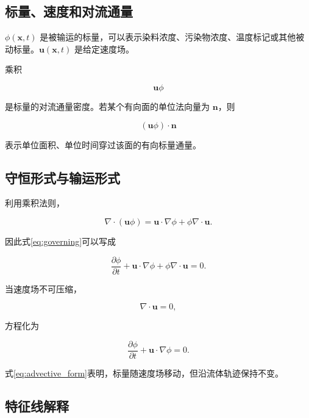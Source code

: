 \documentclass[UTF8,12pt,a4paper,fontset=fandol]{ctexart}
\numberwithin{equation}{section}
\newcommand{\xf}{\bm x}
\begin{document}
\subsection{标量、速度和对流通量}

$\phi(\xf,t)$ 是被输运的标量，可以表示染料浓度、污染物浓度、温度标记或其他被动标量。$\bm u(\xf,t)$ 是给定速度场。

乘积

\begin{equation}
  \bm u\phi
\end{equation}

是标量的对流通量密度。若某个有向面的单位法向量为 $\bm n$，则

\begin{equation}
  (\bm u\phi)\cdot\bm n
\end{equation}

表示单位面积、单位时间穿过该面的有向标量通量。

\subsection{守恒形式与输运形式}

利用乘积法则，

\begin{equation}
  \nabla\cdot(\bm u\phi)
  =
  \bm u\cdot\nabla\phi
  +\phi\nabla\cdot\bm u.
\end{equation}

因此式\eqref{eq:governing}可以写成

\begin{equation}
  \frac{\partial\phi}{\partial t}
  +\bm u\cdot\nabla\phi
  +\phi\nabla\cdot\bm u=0.
\end{equation}

当速度场不可压缩，

\begin{equation}
  \nabla\cdot\bm u=0,
\end{equation}

方程化为

\begin{equation}
  \frac{\partial\phi}{\partial t}
  +\bm u\cdot\nabla\phi=0.
  \label{eq:advective_form}
\end{equation}

式\eqref{eq:advective_form}表明，标量随速度场移动，但沿流体轨迹保持不变。

\subsection{特征线解释}
\end{document}
